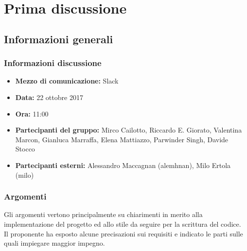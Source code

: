 \documentclass[main.tex]{subfiles}
\begin{document}
\chapter{Prima discussione}
\section{Informazioni generali}
\subsection{Informazioni discussione}
\begin{itemize}
	\item \textbf{Mezzo di comunicazione:} Slack
	\item \textbf{Data:} 22 ottobre 2017
	\item \textbf{Ora:} 11:00
	\item \textbf{Partecipanti del gruppo:} Mirco Cailotto, Riccardo E. Giorato, Valentina Marcon, Gianluca Marraffa, Elena Mattiazzo, Parwinder Singh, Davide Stocco
	\item \textbf{Partecipanti esterni:} Alessandro Maccagnan (alemhnan), Milo Ertola (milo)
\end{itemize}
\subsection{Argomenti}
	Gli argomenti vertono principalmente su chiarimenti in merito alla implementazione del progetto ed allo stile da seguire per la scrittura del codice.\\
	Il proponente ha esposto alcune precisazioni sui requisiti e indicato le parti sulle quali impiegare maggior impegno.
\end{document}
